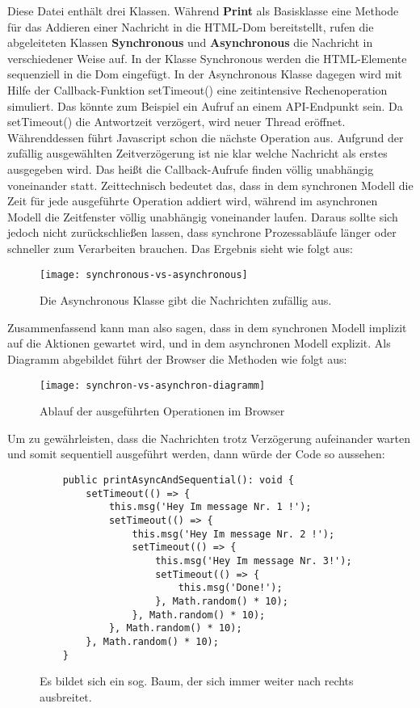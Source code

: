 \noindent
Diese Datei enthält drei Klassen. Während \textbf{Print} als Basisklasse eine Methode für das Addieren einer Nachricht in die HTML-Dom bereitstellt, rufen die abgeleiteten Klassen \textbf{Synchronous} und \textbf{Asynchronous} die Nachricht in verschiedener Weise auf. In der Klasse Synchronous werden die HTML-Elemente sequenziell in die Dom eingefügt. In der Asynchronous Klasse dagegen wird mit Hilfe der Callback-Funktion setTimeout() eine zeitintensive Rechenoperation simuliert. Das könnte zum Beispiel ein Aufruf an einem API-Endpunkt sein. Da setTimeout() die Antwortzeit verzögert, wird neuer Thread eröffnet. Währenddessen führt Javascript schon die nächste Operation aus. Aufgrund der zufällig ausgewählten Zeitverzögerung ist nie klar welche Nachricht als erstes ausgegeben wird. Das heißt die Callback-Aufrufe finden völlig unabhängig voneinander statt. Zeittechnisch bedeutet das, dass in dem synchronen Modell die Zeit für jede ausgeführte Operation addiert wird, während im asynchronen Modell die Zeitfenster völlig unabhängig voneinander laufen. Daraus sollte sich jedoch nicht zurückschließen lassen, dass synchrone Prozessabläufe länger oder schneller zum Verarbeiten brauchen.
Das Ergebnis sieht wie folgt aus:

\begin{figure}[H]
\centering
\texttt{[image: synchronous-vs-asynchronous]}
\caption{Die Asynchronous Klasse gibt die Nachrichten zufällig aus.}
\end{figure}

\noindent
Zusammenfassend kann man also sagen, dass in dem synchronen Modell implizit auf die Aktionen gewartet wird, und in dem asynchronen Modell explizit. Als Diagramm abgebildet führt der Browser die Methoden wie folgt aus:

\begin{center}
\begin{figure}[H]
\texttt{[image: synchron-vs-asynchron-diagramm]}
\caption{Ablauf der ausgeführten Operationen im Browser}
\end{figure}
\end{center}

\noindent
Um zu gewährleisten, dass die Nachrichten trotz Verzögerung aufeinander warten und somit sequentiell ausgeführt werden, dann würde der Code so aussehen:

\begin{figure}[H]
\begin{lstlisting}
    public printAsyncAndSequential(): void {
        setTimeout(() => {
            this.msg('Hey Im message Nr. 1 !');
            setTimeout(() => {
                this.msg('Hey Im message Nr. 2 !');
                setTimeout(() => {
                    this.msg('Hey Im message Nr. 3!');
                    setTimeout(() => {
                        this.msg('Done!');
                    }, Math.random() * 10);
                }, Math.random() * 10);
            }, Math.random() * 10);
        }, Math.random() * 10);
    }
\end{lstlisting}
\caption{Es bildet sich ein sog. Baum, der sich immer weiter nach rechts ausbreitet.}
\end{figure}

